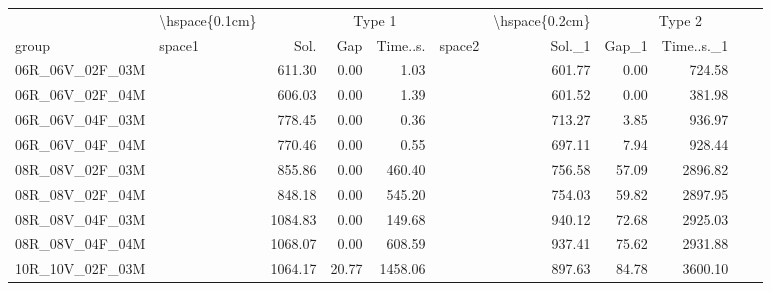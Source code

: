 
\begin{tabular}{llrrrlrrr}
\toprule
\multicolumn{1}{c}{} & \multicolumn{1}{c}{\textbackslash{}hspace\{0.1cm\}} & \multicolumn{4}{c}{Type 1} & \multicolumn{1}{c}{\textbackslash{}hspace\{0.2cm\}} & \multicolumn{4}{c}{Type 2} \\
\cmidrule(l{3pt}r{3pt}){2-2} \cmidrule(l{3pt}r{3pt}){3-6} \cmidrule(l{3pt}r{3pt}){7-7} \cmidrule(l{3pt}r{3pt}){8-11}
group & space1 & Sol. & Gap & Time..s. & space2 & Sol.\_1 & Gap\_1 & Time..s.\_1\\
\midrule
06R\_06V\_02F\_03M & \hspace{0.1cm} & 611.30 & 0.00 & 1.03 & \hspace{0.2cm} & 601.77 & 0.00 & 724.58\\
06R\_06V\_02F\_04M & \hspace{0.1cm} & 606.03 & 0.00 & 1.39 & \hspace{0.2cm} & 601.52 & 0.00 & 381.98\\
06R\_06V\_04F\_03M & \hspace{0.1cm} & 778.45 & 0.00 & 0.36 & \hspace{0.2cm} & 713.27 & 3.85 & 936.97\\
06R\_06V\_04F\_04M & \hspace{0.1cm} & 770.46 & 0.00 & 0.55 & \hspace{0.2cm} & 697.11 & 7.94 & 928.44\\
\addlinespace
08R\_08V\_02F\_03M & \hspace{0.1cm} & 855.86 & 0.00 & 460.40 & \hspace{0.2cm} & 756.58 & 57.09 & 2896.82\\
08R\_08V\_02F\_04M & \hspace{0.1cm} & 848.18 & 0.00 & 545.20 & \hspace{0.2cm} & 754.03 & 59.82 & 2897.95\\
08R\_08V\_04F\_03M & \hspace{0.1cm} & 1084.83 & 0.00 & 149.68 & \hspace{0.2cm} & 940.12 & 72.68 & 2925.03\\
08R\_08V\_04F\_04M & \hspace{0.1cm} & 1068.07 & 0.00 & 608.59 & \hspace{0.2cm} & 937.41 & 75.62 & 2931.88\\
\addlinespace
10R\_10V\_02F\_03M & \hspace{0.1cm} & 1064.17 & 20.77 & 1458.06 & \hspace{0.2cm} & 897.63 & 84.78 & 3600.10\\

\end{tabular}
